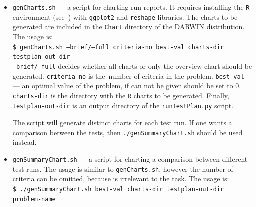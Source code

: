 \begin{itemize}
\item \texttt{genCharts.sh} --- a script for charting run reports. It requires
  installing the \texttt{R} environment (see~\cite{kee10}) with
  \texttt{ggplot2} and \texttt{reshape} libraries. The charts to be generated
  are included in the
  \texttt{Chart} directory of the DARWIN distribution. The usage is: \\
  \texttt{\$ genCharts.sh --brief/--full criteria-no best-val charts-dir
    testplan-out-dir} \\
  \texttt{--brief/--full} decides whether all charts or only the overview
  chart should be generated. \texttt{criteria-no} is the~number of criteria in
  the problem. \texttt{best-val} --- an optimal value of the problem, if can
  not be given should be set to $0$. \texttt{charts-dir} is the directory with
  the \texttt{R} charts to be generated. Finally, \texttt{testplan-out-dir} is
  an output directory of the \texttt{runTestPlan.py} script.

  The script will generate distinct charts for each test run. If one wants a
  comparison between the tests, then \texttt{./genSummaryChart.sh} should be
  used instead.

\item \texttt{genSummaryChart.sh} --- a script for charting a comparison
  between different test runs. The usage is similar to \texttt{genCharts.sh},
  however the number of criteria can be omitted, because is irrelevant to the
  task. The usage is: \\
  \texttt{\$ ./genSummaryChart.sh best-val charts-dir testplan-out-dir
    problem-name}



\end{itemize}


